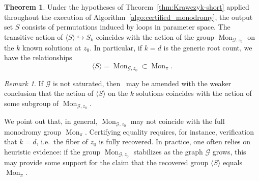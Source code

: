 \documentclass[11pt]{amsart}
\theoremstyle{definition}
\newtheorem{thm}[definition]{Theorem}
\theoremstyle{remark}
\newtheorem{remark}[definition]{Remark}
\DeclareMathOperator{\Mon}{Mon}
\begin{document}
\begin{thm}\label{thm:correctness}
    Under the hypotheses of Theorem~\ref{thm:Krawczyk-short} applied throughout the execution of Algorithm~\ref{algo:certified_monodromy}, the output set $S$ consists of permutations induced by loops in parameter space.
    The transitive action of $\langle S \rangle \hookrightarrow S_k$ coincides with the action of the group $\Mon_{\mathcal{G},z_0}$ on the $k$ known solutions at $z_0.$ 
    In particular, if $k=d$ is the generic root count, we have the relationships
    $$\langle S \rangle = \Mon_{\mathcal{G},z_0} \subset \Mon_\pi.$$ 
\end{thm}

\begin{remark}\label{remark:saturated-action}
If $\mathcal{G}$ is not saturated, then~ may be amended with the weaker conclusion that the action of $\langle S \rangle $ on the $k$ solutions coincides with the action of some subgroup of $\Mon_{\mathcal{G},z_0}$.
\end{remark}

We point out that, in general, $\Mon_{\mathcal{G},z_0}$ may not coincide with the full monodromy group $\Mon_\pi$. Certifying equality requires, for instance, verification that $k=d$, i.e.~the fiber of $z_0$ is fully recovered. In practice, one often relies on heuristic evidence: if the group $\Mon_{\mathcal{G},z_0}$ stabilizes as the graph $\mathcal{G}$ grows, this may provide some support for the claim that the recovered group $\langle S \rangle $ equals $\Mon_\pi$.
\end{document}
